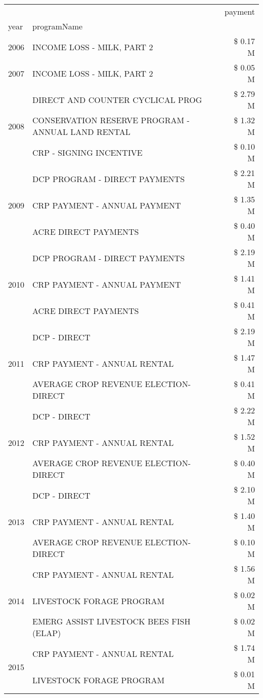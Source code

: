 \begin{tabular}{llr}
\toprule
 &  & payment \\
year & programName &  \\
\midrule
2006 & INCOME LOSS - MILK, PART 2 & \$ 0.17 M \\
\cline{1-3}
2007 & INCOME LOSS - MILK, PART 2 & \$ 0.05 M \\
\cline{1-3}
\multirow[t]{3}{*}{2008} & DIRECT AND COUNTER CYCLICAL PROG & \$ 2.79 M \\
 & CONSERVATION RESERVE PROGRAM - ANNUAL LAND RENTAL & \$ 1.32 M \\
 & CRP - SIGNING INCENTIVE & \$ 0.10 M \\
\cline{1-3}
\multirow[t]{3}{*}{2009} & DCP PROGRAM - DIRECT PAYMENTS & \$ 2.21 M \\
 & CRP PAYMENT - ANNUAL PAYMENT & \$ 1.35 M \\
 & ACRE DIRECT PAYMENTS & \$ 0.40 M \\
\cline{1-3}
\multirow[t]{3}{*}{2010} & DCP PROGRAM - DIRECT PAYMENTS & \$ 2.19 M \\
 & CRP PAYMENT - ANNUAL PAYMENT & \$ 1.41 M \\
 & ACRE DIRECT PAYMENTS & \$ 0.41 M \\
\cline{1-3}
\multirow[t]{3}{*}{2011} & DCP - DIRECT & \$ 2.19 M \\
 & CRP PAYMENT - ANNUAL RENTAL & \$ 1.47 M \\
 & AVERAGE CROP REVENUE ELECTION-DIRECT & \$ 0.41 M \\
\cline{1-3}
\multirow[t]{3}{*}{2012} & DCP - DIRECT & \$ 2.22 M \\
 & CRP PAYMENT - ANNUAL RENTAL & \$ 1.52 M \\
 & AVERAGE CROP REVENUE ELECTION-DIRECT & \$ 0.40 M \\
\cline{1-3}
\multirow[t]{3}{*}{2013} & DCP - DIRECT & \$ 2.10 M \\
 & CRP PAYMENT - ANNUAL RENTAL & \$ 1.40 M \\
 & AVERAGE CROP REVENUE ELECTION-DIRECT & \$ 0.10 M \\
\cline{1-3}
\multirow[t]{3}{*}{2014} & CRP PAYMENT - ANNUAL RENTAL & \$ 1.56 M \\
 & LIVESTOCK FORAGE PROGRAM & \$ 0.02 M \\
 & EMERG ASSIST LIVESTOCK BEES FISH (ELAP) & \$ 0.02 M \\
\cline{1-3}
\multirow[t]{3}{*}{2015} & CRP PAYMENT - ANNUAL RENTAL & \$ 1.74 M \\
 & LIVESTOCK FORAGE PROGRAM & \$ 0.01 M \\

\end{tabular}
